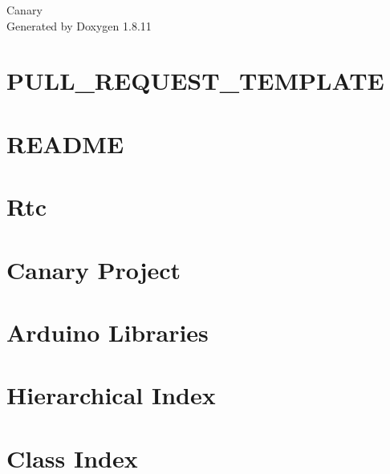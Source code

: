 \documentclass[twoside]{book}
\newcommand{\+}{\discretionary{\mbox{\scriptsize$\hookleftarrow$}}{}{}}
\newcommand{\clearemptydoublepage}{%
  \newpage{\pagestyle{empty}\cleardoublepage}%
}
\begin{document}
\hypersetup{pageanchor=false,
             bookmarksnumbered=true,
             pdfencoding=unicode
            }
\begin{titlepage}
\vspace*{7cm}
\begin{center}%
{\Large Canary }\\
\vspace*{1cm}
{\large Generated by Doxygen 1.8.11}\\
\end{center}
\end{titlepage}
\clearemptydoublepage
\tableofcontents
\clearemptydoublepage
{}
\hypersetup{pageanchor=true}

\chapter{P\+U\+L\+L\+\_\+\+R\+E\+Q\+U\+E\+S\+T\+\_\+\+T\+E\+M\+P\+L\+A\+TE}
\label{md_lib_DHT_PULL_REQUEST_TEMPLATE}
\hypertarget{md_lib_DHT_PULL_REQUEST_TEMPLATE}{}

\chapter{R\+E\+A\+D\+ME}
\label{md_lib_DHT_README}
\hypertarget{md_lib_DHT_README}{}

\chapter{Rtc}
\label{md_lib_RTC_README}
\hypertarget{md_lib_RTC_README}{}

\chapter{Canary Project}
\label{md_README}
\hypertarget{md_README}{}

\chapter{Arduino Libraries}
\label{md_README_PTBR}
\hypertarget{md_README_PTBR}{}

\chapter{Hierarchical Index}

\chapter{Class Index}

\end{document}
